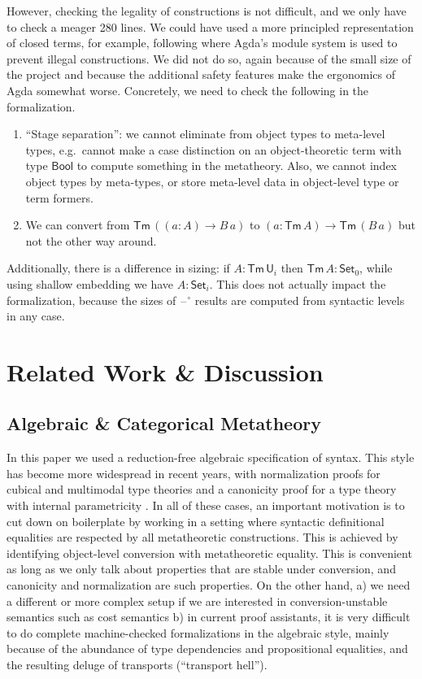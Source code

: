 \documentclass[acmsmall,screen,review]{acmart}
\newcommand{\msf}[1]{{\mathsf{#1}}}
\newcommand{\U}{\msf{U}}
\newcommand{\Set}{\msf{Set}}
\newcommand{\blank}{{\mathord{\hspace{1pt}\text{--}\hspace{1pt}}}}
\newcommand{\Bool}{\msf{Bool}}
\newcommand{\Tm}{\msf{Tm}}
\newcommand{\w}{\circ}
\begin{document}
However, checking the legality of constructions is not difficult, and we only have to check a meager
280 lines. We could have used a more principled representation of closed terms, for example,
following \citet{DBLP:conf/mpc/KaposiKK19} where Agda's module system is used to prevent illegal
constructions. We did not do so, again because of the small size of the project and because the
additional safety features make the ergonomics of Agda somewhat worse. Concretely, we need to check
the following in the formalization.
\begin{enumerate}
\item ``Stage separation'': we cannot eliminate from object types to meta-level types, e.g.\ cannot make a case distinction
      on an object-theoretic term with type $\Bool$ to compute something in the metatheory. Also, we cannot index
      object types by meta-types, or store meta-level data in object-level type or term formers.
\item We can convert from $\Tm\,((a : A) \to B\,a)$ to $(a : \Tm\,A) \to \Tm\,(B\,a)$ but not the other way around.
\end{enumerate}
Additionally, there is a difference in sizing: if $A : \Tm\,\U_i$ then $\Tm\,A : \Set_0$, while
using shallow embedding we have $A : \Set_i$. This does not actually impact the formalization,
because the sizes of $\blank^\w$ results are computed from syntactic levels in any case.

\section{Related Work \& Discussion}

\subsection{Algebraic \& Categorical Metatheory}

In this paper we used a reduction-free algebraic specification of syntax.  This style has become
more widespread in recent years, with normalization proofs for cubical \cite{ctt-normalization} and
multimodal type theories \cite{DBLP:conf/lics/Gratzer22} and a canonicity proof for a type theory
with internal parametricity \cite{altenkirch2024internal}. In all of these cases, an important
motivation is to cut down on boilerplate by working in a setting where syntactic definitional
equalities are respected by all metatheoretic constructions. This is achieved by identifying
object-level conversion with metatheoretic equality. This is convenient as long as we only talk
about properties that are stable under conversion, and canonicity and normalization are such
properties. On the other hand, a) we need a different or more complex setup if we are interested in
conversion-unstable semantics such as cost semantics b) in current proof assistants, it is very
difficult to do complete machine-checked formalizations in the algebraic style, mainly because of
the abundance of type dependencies and propositional equalities, and the resulting deluge of
transports (``transport hell'').
\end{document}
